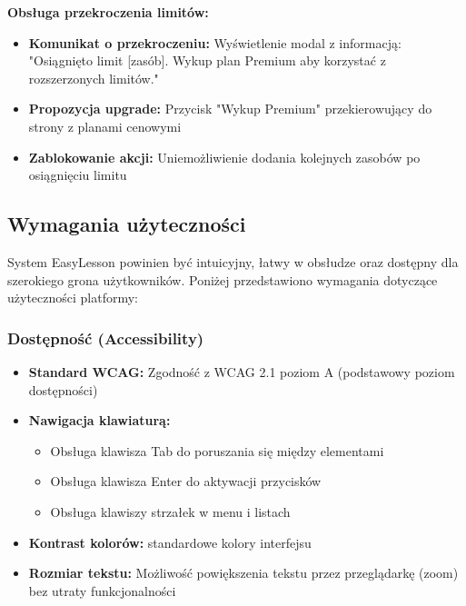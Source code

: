 \documentclass[12pt,a4paper]{article}
\begin{document}
\textbf{Obsługa przekroczenia limitów:}

\begin{itemize}[leftmargin=*]
    \item \textbf{Komunikat o przekroczeniu:} Wyświetlenie modal z informacją: "Osiągnięto limit [zasób]. Wykup plan Premium aby korzystać z rozszerzonych limitów."
    \item \textbf{Propozycja upgrade:} Przycisk "Wykup Premium" przekierowujący do strony z planami cenowymi
    \item \textbf{Zablokowanie akcji:} Uniemożliwienie dodania kolejnych zasobów po osiągnięciu limitu
    
\end{itemize}

\subsection{Wymagania użyteczności}

System EasyLesson powinien być intuicyjny, łatwy w obsłudze oraz dostępny dla szerokiego grona użytkowników. Poniżej przedstawiono wymagania dotyczące użyteczności platformy:

\subsubsection{Dostępność (Accessibility)}

\begin{itemize}[leftmargin=*]
    \item \textbf{Standard WCAG:} Zgodność z WCAG 2.1 poziom A (podstawowy poziom dostępności)
    \item \textbf{Nawigacja klawiaturą:} 
    \begin{itemize}
        \item Obsługa klawisza Tab do poruszania się między elementami
        \item Obsługa klawisza Enter do aktywacji przycisków
        \item Obsługa klawiszy strzałek w menu i listach
    \end{itemize}
   
    \item \textbf{Kontrast kolorów:} standardowe kolory interfejsu
    \item \textbf{Rozmiar tekstu:} Możliwość powiększenia tekstu przez przeglądarkę (zoom) bez utraty funkcjonalności
\end{itemize}
\end{document}

